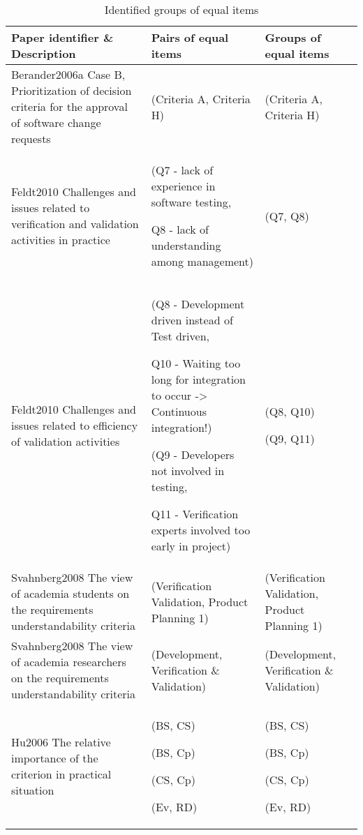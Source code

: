 %
\begin{table*}
	\scriptsize
\caption{\label{tab:ECVresult-1}Identified groups of equal items}


\begin{tabular}{
|>{\centering}p{}
|>{\centering}p{}
|>{\centering}p{}|}
\hline 
Paper identifier \& Description  & Pairs of equal items  & Groups of equal items\tabularnewline
\hline

Berander2006a \citep{Berander2006a} Case B, Prioritization of decision criteria for the approval of software
change requests  & (Criteria A, Criteria H)  & (Criteria A, Criteria H)\tabularnewline
\hline

Feldt2010 \citep{Feldt2010} Challenges and issues related to verification and validation activities in practice & 
(Q7 - lack of experience in software testing, 

Q8 - lack of understanding among management) &
(Q7, Q8)\tabularnewline
\hline 

Feldt2010 \citep{Feldt2010} Challenges and issues related to efficiency of validation activities &
(Q8 - \textquotedbl{}Development driven\textquotedbl{} instead of \textquotedbl{}Test driven\textquotedbl{},

Q10 - Waiting too long for integration to occur -> Continuous integration!) 

(Q9 - Developers not involved in testing, 

Q11 - Verification experts involved too early in project) &

(Q8, Q10) 

(Q9, Q11)
\tabularnewline
\hline 


Svahnberg2008 \citep{Svahnberg2008} The view of academia students on the requirements understandability
criteria  & (Verification Validation, Product Planning 1)  & (Verification Validation, Product Planning 1)\tabularnewline
\hline 
Svahnberg2008 \citep{Svahnberg2008} The view of academia researchers on the requirements understandability
criteria  & (Development, Verification \& Validation) & (Development, Verification \& Validation)\tabularnewline
\hline 
Hu2006\citep{Hu2006} The relative importance of the criterion in practical situation & (BS, CS)

(BS, Cp)

(CS, Cp)

(Ev, RD) & (BS, CS)

(BS, Cp)

(CS, Cp)

(Ev, RD)\tabularnewline
\hline 



\end{tabular}
\end{table*}
